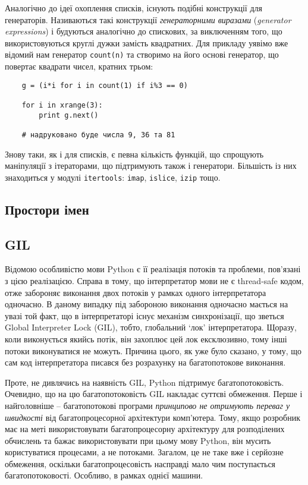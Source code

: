 \documentclass[a4paper, 12pt, onsedie]{article}
\begin{document}
    Аналогічно до ідеї охоплення списків, існують подібні конструкції для
    генераторів. Називаються такі конструкції \emph{генераторними виразами} 
    (\emph{generator expressions}) і будуються аналогічно до спискових, за
    виключенням того, що використовуються круглі дужки замість квадратних.
    Для прикладу уявімо вже відомий нам генератор \texttt{count(n)} та 
    створимо на його основі генератор, що повертає квадрати чисел, кратних
    трьом:
    \begin{verbatim}
    g = (i*i for i in count(1) if i%3 == 0)

    for i in xrange(3): 
        print g.next()

    # надруковано буде числа 9, 36 та 81
    \end{verbatim}

    Знову таки, як і для списків, є певна кількість функцій, що спрощують
    маніпуляції з ітераторами, що підтримують також і генератори. 
    Більшість із них знаходиться у модулі \texttt{itertools}:
    \texttt{imap}, \texttt{islice}, \texttt{izip} тощо.

\subsection{Простори імен}

\subsection{GIL}
    Відомою особливістю мови Python є її реалізація потоків та проблеми, пов'язані з цією
    реалізацією. Справа в тому, що інтерпретатор мови не є thread-safe кодом, отже забороняє
    виконання двох потоків у рамках одного інтерпретатора одночасно. В даному випадку під
    забороною виконання одночасно мається на увазі той факт, що в інтерпретаторі існує
    механізм синхронізації, що зветься Global Interpreter Lock (GIL), тобто, глобальний `лок'
    інтерпретатора. Щоразу, коли виконується якийсь потік, він захоплює цей лок ексклюзивно,
    тому інші потоки виконуватися не можуть. Причина цього, як уже було сказано, у тому, що
    сам код інтерпретатора писався без розрахунку на багатопотокове виконання. 

    Проте, не дивлячись на наявність GIL, Python підтримує багатопотоковість. Очевидно, що
    на цю багатопотоковість GIL накладає суттєві обмеження. Перше і найголовніше -- 
    багатопотокові програми \emph{принципово не отримують переваг у швидкості}
    від багатопроцесорної архітектури комп'ютера. Тому, якщо розробник має на меті 
    використовувати багатопроцесорну архітектуру для розподілених обчислень та бажає
    використовувати при цьому мову Python, він мусить користуватися процесами, а не потоками.
    Загалом, це не таке вже і серйозне обмеження, оскільки багатопроцесовість насправді мало
    чим поступається багатопотоковості. Особливо, в рамках однієї машини.
\end{document}
